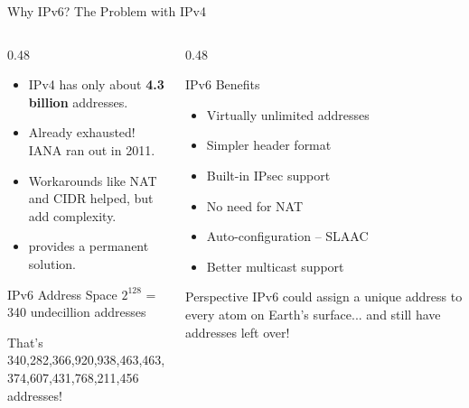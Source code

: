 \documentclass[aspectratio=169]{beamer}  %
\begin{document}
\begin{frame}{Why IPv6? The Problem with IPv4}
    \begin{columns}[T]
        \begin{column}{0.48\textwidth}
            \begin{itemize}
                \item IPv4 has only about \textbf{4.3 billion} addresses.
                \item Already exhausted! IANA ran out in 2011.
                \item Workarounds like NAT and CIDR helped, but add complexity.
                \item {} provides a permanent solution.
            \end{itemize}
            
            \vspace{0.3em}
            \begin{alertblock}{IPv6 Address Space}
                $2^{128}$ = 340 undecillion addresses
                
                \vspace{0.2em}
                That's 340,282,366,920,938,463,463,\\374,607,431,768,211,456 addresses!
            \end{alertblock}
        \end{column}
        \begin{column}{0.48\textwidth}
            \begin{block}{IPv6 Benefits}
                \begin{itemize}
                    \item Virtually unlimited addresses
                    \item Simpler header format
                    \item Built-in IPsec support
                    \item No need for NAT
                    \item Auto-configuration -- SLAAC
                    \item Better multicast support
                \end{itemize}
            \end{block}
            
            \vspace{0.3em}
            \begin{exampleblock}{Perspective}
                \small
                IPv6 could assign a unique address to every atom on Earth's surface... and still have addresses left over!
            \end{exampleblock}
        \end{column}
    \end{columns}
\end{frame}
\end{document}
